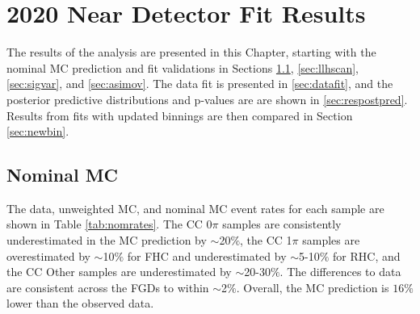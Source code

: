 \chapter{2020 Near Detector Fit Results}\label{sec:2020Fit}

The results of the analysis are presented in this Chapter, starting with the nominal MC prediction and fit validations in Sections \ref{sec:nommc}, \ref{sec:llhscan}, \ref{sec:sigvar}, and \ref{sec:asimov}. The data fit is presented in \ref{sec:datafit}, and the posterior predictive distributions and p-values are are shown in \ref{sec:respostpred}. Results from fits with updated binnings are then compared in Section \ref{sec:newbin}.

\section{Nominal MC}\label{sec:nommc}

The data, unweighted MC, and nominal MC event rates for each sample are shown in Table \ref{tab:nomrates}. The CC 0$\pi$ samples are consistently underestimated in the MC prediction by $\sim$20$\%$, the CC 1$\pi$ samples are overestimated by $\sim$10$\%$ for FHC and underestimated by $\sim$5-10$\%$ for RHC, and the CC Other samples are underestimated by $\sim$20-30$\%$. The differences to data are consistent across the FGDs to within $\sim$2$\%$. Overall, the MC prediction is $16\%$ lower than the observed data.

